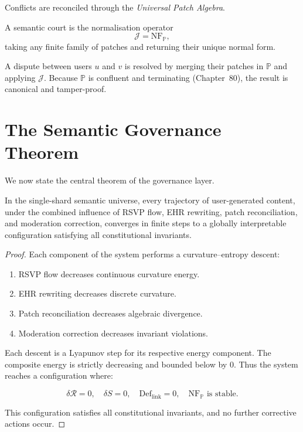 Conflicts are reconciled through the \emph{Universal Patch Algebra}.

\begin{definition}
A semantic court is the normalisation operator
\[
\mathcal{J} = \mathrm{NF}_{\mathbb{P}},
\]
taking any finite family of patches and returning their unique normal form.
\end{definition}

A dispute between users $u$ and $v$ is resolved by merging
their patches in $\mathbb{P}$ and applying $\mathcal{J}$.
Because $\mathbb{P}$ is confluent and terminating (Chapter~80),
the result is canonical and tamper-proof.

\section{The Semantic Governance Theorem}

We now state the central theorem of the governance layer.

\begin{theorem}
In the single-shard semantic universe,
every trajectory of user-generated content, under the combined influence of
RSVP flow, EHR rewriting, patch reconciliation, and moderation correction,
converges in finite steps to a globally interpretable configuration
satisfying all constitutional invariants.
\end{theorem}

\begin{proof}
Each component of the system performs a curvature--entropy descent:

\begin{enumerate}
  \item RSVP flow decreases continuous curvature energy.
  \item EHR rewriting decreases discrete curvature.
  \item Patch reconciliation decreases algebraic divergence.
  \item Moderation correction decreases invariant violations.
\end{enumerate}

Each descent is a Lyapunov step for its respective energy component.
The composite energy is strictly decreasing and bounded below by $0$.
Thus the system reaches a configuration where:

\[
\delta \mathcal{R} = 0,\quad
\delta S = 0,\quad
\mathrm{Def}_{\mathrm{link}} = 0,\quad
\mathrm{NF}_{\mathbb{P}} \text{ is stable}.
\]

This configuration satisfies all constitutional invariants,
and no further corrective actions occur.
\end{proof}

